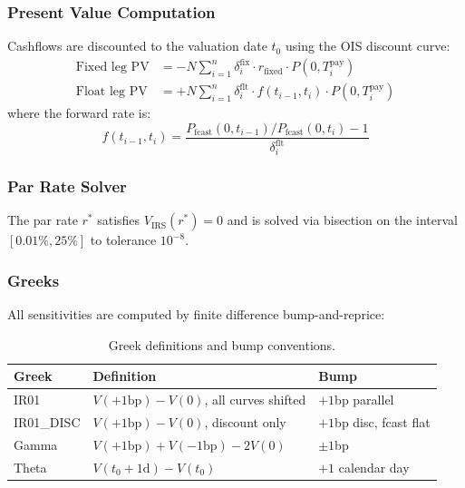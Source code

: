 \documentclass[11pt,a4paper]{article}
\begin{document}
\subsubsection{Present Value Computation}

Cashflows are discounted to the valuation date $t_0$ using the OIS discount curve:
\begin{align}
  \text{Fixed leg PV} &= -N \sum_{i=1}^n \delta_i^{\text{fix}} \cdot r_\text{fixed} \cdot P(0, T_i^{\text{pay}}) \\
  \text{Float leg PV} &= +N \sum_{i=1}^n \delta_i^{\text{flt}} \cdot f(t_{i-1}, t_i) \cdot P(0, T_i^{\text{pay}})
\end{align}
where the forward rate is:
\begin{equation}
  f(t_{i-1}, t_i) = \frac{P_\text{fcast}(0, t_{i-1}) / P_\text{fcast}(0, t_i) - 1}{\delta_i^{\text{flt}}}
\end{equation}

\subsubsection{Par Rate Solver}

The par rate $r^*$ satisfies $V_\text{IRS}(r^*) = 0$ and is solved via bisection
on the interval $[0.01\%, 25\%]$ to tolerance $10^{-8}$.

\subsubsection{Greeks}

All sensitivities are computed by finite difference bump-and-reprice:

\begin{table}[H]
\centering
\begin{tabular}{lll}
\toprule
\textbf{Greek} & \textbf{Definition} & \textbf{Bump} \\
\midrule
IR01        & $V(+1\text{bp}) - V(0)$, all curves shifted & $+1$bp parallel \\
IR01\_DISC  & $V(+1\text{bp}) - V(0)$, discount only      & $+1$bp disc, fcast flat \\
Gamma       & $V(+1\text{bp}) + V(-1\text{bp}) - 2V(0)$   & $\pm 1$bp \\
Theta       & $V(t_0 + 1\text{d}) - V(t_0)$               & $+1$ calendar day \\
\bottomrule
\end{tabular}
\caption{Greek definitions and bump conventions.}
\end{table}
\end{document}
